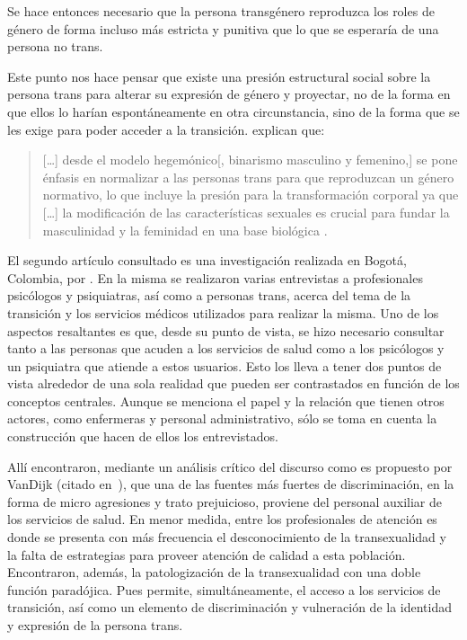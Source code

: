 Se hace entonces necesario que la persona transgénero reproduzca los roles de
género de forma incluso más estricta y punitiva que lo que se esperaría de una
persona no trans.

Este punto nos hace pensar que existe una presión estructural social sobre la
persona trans para alterar su expresión de género y proyectar, no de la forma en
que ellos lo harían espontáneamente en otra circunstancia, sino de la forma que
se les exige para poder acceder a la transición. \textcite{Coll-Planas2015}
explican que:

\begin{quote}
[…] desde el modelo hegemónico[, binarismo masculino y femenino,] se pone
énfasis en normalizar a las personas trans para que reproduzcan un género
normativo, lo que incluye la presión para la transformación corporal ya que […]
la modificación de las características sexuales es crucial para fundar la
masculinidad y la feminidad en una base biológica \parencite[][p.
427]{Coll-Planas2015}.
\end{quote}

El segundo artículo consultado es una investigación realizada en Bogotá,
Colombia, por \textcite{LassoBaez2014}. En la misma se realizaron varias
entrevistas a profesionales psicólogos y psiquiatras, así como a personas trans,
acerca del tema de la transición y los servicios médicos utilizados para
realizar la misma. Uno de los aspectos resaltantes es que, desde su punto de
vista, se hizo necesario consultar tanto a las personas que acuden a los
servicios de salud como a los psicólogos y un psiquiatra que atiende a estos
usuarios. Esto los lleva a tener dos puntos de vista alrededor de una sola
realidad que pueden ser contrastados en función de los conceptos centrales.
Aunque se menciona el papel y la relación que tienen otros actores, como
enfermeras y personal administrativo, sólo se toma en cuenta la construcción que
hacen de ellos los entrevistados.

Allí encontraron, mediante un análisis crítico del discurso como es propuesto
por VanDijk (citado en~\cite[][p. 111]{LassoBaez2014}), que una de las fuentes
más fuertes de discriminación, en la forma de micro agresiones y trato
prejuicioso, proviene del personal auxiliar de los servicios de salud. En menor
medida, entre los profesionales de atención es donde se presenta con más
frecuencia el desconocimiento de la transexualidad y la falta de estrategias para
proveer atención de calidad a esta población. Encontraron, además, la
patologización de la transexualidad con una doble función paradójica. Pues
permite, simultáneamente, el acceso a los servicios de transición, así como un
elemento de discriminación y vulneración de la identidad y expresión de la
persona trans.

